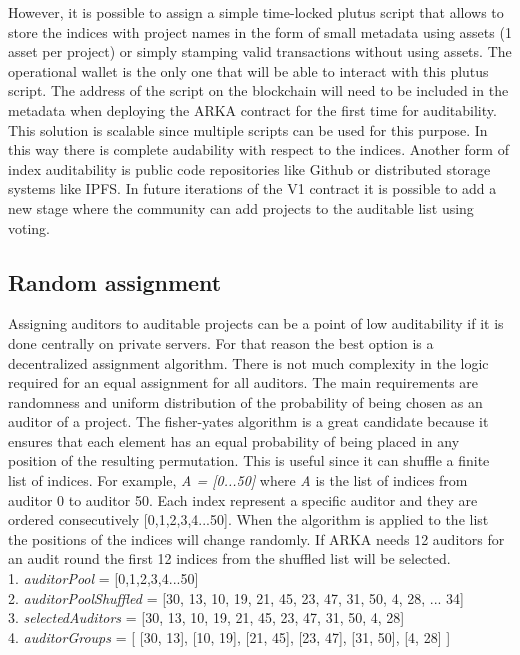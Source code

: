\documentclass[12pt]{article}
\begin{document}
However, it is possible to assign a simple time-locked plutus script that allows to store the indices with project names in the form of small metadata using assets (1 asset per project) or simply stamping valid transactions without using assets. The operational wallet is the only one that will be able to interact with this plutus script. The address of the script on the blockchain will need to be included in the metadata when deploying the ARKA contract for the first time for auditability. This solution is scalable since multiple scripts can be used for this purpose. In this way there is complete audability with respect to the indices. Another form of index auditability is public code repositories like Github or distributed storage systems like IPFS. In future iterations of the V1 contract it is possible to add a new stage where the community can add projects to the auditable list using voting.

\subsection { Random assignment }
   
Assigning auditors to auditable projects can be a point of low auditability if it is done centrally on private servers. For that reason the best option is a decentralized assignment algorithm. There is not much complexity in the logic required for an equal assignment for all auditors. The main requirements are randomness and uniform distribution of the probability of being chosen as an auditor of a project. The fisher-yates algorithm is a great candidate because it ensures that each element has an equal probability of being placed in any position of the resulting permutation. This is useful since it can shuffle a finite list of indices. For example, \emph {A = [0...50]} where \emph {A} is the list of indices from auditor 0 to auditor 50. Each index represent a specific auditor and they are ordered consecutively [0,1,2,3,4...50]. When the algorithm is applied to the list the positions of the indices will change randomly. If ARKA needs 12 auditors for an audit round the first 12 indices from the shuffled list will be selected.\\

1. \emph {auditorPool } = [0,1,2,3,4...50] \\
2. \emph {auditorPoolShuffled } = [30, 13, 10, 19, 21, 45, 23, 47, 31, 50,  4, 28, ... 34]\\
3. \emph {selectedAuditors} = [30, 13, 10, 19, 21, 45, 23, 47, 31, 50,  4, 28]\\
4. \emph {auditorGroups } = [ [30, 13], [10, 19], [21, 45], [23, 47], [31, 50],  [4, 28] ]\\
\end{document}
